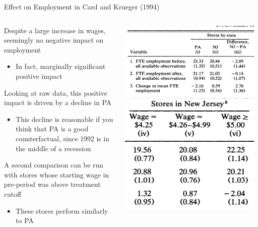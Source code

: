 \documentclass[notes,11pt, aspectratio=169]{beamer}
\newenvironment{wideitemize}{\itemize\addtolength{\itemsep}{10pt}}{\enditemize}
\begin{document}
\begin{frame}{Effect on Employment in Card and Krueger (1994) }
  \begin{columns}[T] %
    \begin{column}{0.5\textwidth}
      \begin{wideitemize}
      \item Despite a large increase in wages, seemingly no negative
        impact on employment
        \begin{itemize}
        \item In fact, marginally significant positive impact
        \end{itemize}
      \item Looking at raw data, this positive impact is driven by a
        decline in PA
        \begin{itemize}
        \item This decline is reasonable if you think that PA is a
          good counterfactual, since 1992 is in the middle of a recession
        \end{itemize}
      \item A second comparison can be run with stores whose starting
        wage in pre-period was above treatment cutoff
        \begin{itemize}
        \item These stores perform similarly to PA
        \end{itemize}
      \end{wideitemize}
    \end{column}%
    \hfill%
    \begin{column}{.5\textwidth}
      \includegraphics[width=\linewidth]{images/cardkrueger3.png}\\
\hfill      \includegraphics[width=0.5\linewidth]{images/cardkrueger4.png}
    \end{column}%
  \end{columns}
\end{frame}
\end{document}
